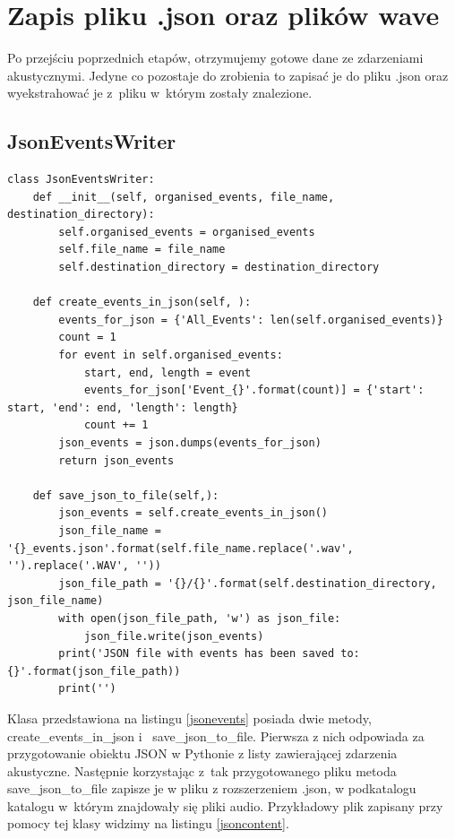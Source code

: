 \documentclass[eng,printmode]{mgr}
\begin{document}
\section{Zapis pliku .json oraz plików wave}
Po przejściu poprzednich etapów, otrzymujemy gotowe dane ze zdarzeniami akustycznymi. Jedyne co pozostaje do zrobienia to zapisać je do pliku .json oraz wyekstrahować je z~pliku w~którym zostały znalezione. 

\subsection{JsonEventsWriter}

\begin{minipage}{\linewidth}
\begin{lstlisting}[caption={fragment kodu źródłowego pliku JsonEventWriter.py, klasa JsonEventsWriter},captionpos=b,label={jsonevents}] 
class JsonEventsWriter:
    def __init__(self, organised_events, file_name, destination_directory):
        self.organised_events = organised_events
        self.file_name = file_name
        self.destination_directory = destination_directory

    def create_events_in_json(self, ):
        events_for_json = {'All_Events': len(self.organised_events)}
        count = 1
        for event in self.organised_events:
            start, end, length = event
            events_for_json['Event_{}'.format(count)] = {'start': start, 'end': end, 'length': length}
            count += 1
        json_events = json.dumps(events_for_json)
        return json_events

    def save_json_to_file(self,):
        json_events = self.create_events_in_json()
        json_file_name = '{}_events.json'.format(self.file_name.replace('.wav', '').replace('.WAV', ''))
        json_file_path = '{}/{}'.format(self.destination_directory, json_file_name)
        with open(json_file_path, 'w') as json_file:
            json_file.write(json_events)
        print('JSON file with events has been saved to: {}'.format(json_file_path))
        print('')
\end{lstlisting}
\end{minipage}

Klasa przedstawiona na listingu \ref{jsonevents} posiada dwie metody, create\_events\_in\_json i~ save\_json\_to\_file. Pierwsza z nich odpowiada za przygotowanie obiektu JSON w Pythonie z listy zawierającej zdarzenia akustyczne. Następnie korzystając z~tak przygotowanego pliku metoda save\_json\_to\_file zapisze je w pliku z rozszerzeniem .json, w podkatalogu katalogu w~którym znajdowały się pliki audio.  Przykładowy plik zapisany przy pomocy tej klasy widzimy na listingu \ref{jsoncontent}. 
\end{document}
